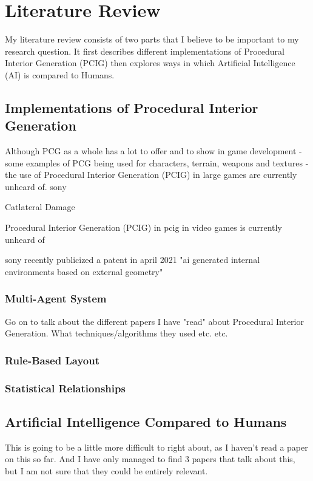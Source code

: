 \section{Literature Review}
My literature review consists of two parts that I believe to be important to my research question.
It first describes different implementations of Procedural Interior Generation (PCIG) then explores
ways in which Artificial Intelligence (AI) is compared to Humans.
\\
\subsection{Implementations of Procedural Interior Generation}
Although PCG as a whole has a lot to offer and to show in game development - some examples of PCG being used for
characters, terrain, weapons and textures - the use of Procedural Interior Generation (PCIG) in large games are currently unheard of.
sony \cite{sony-patent}

Catlateral Damage \cite{game:catlateral}


Procedural Interior Generation (PCIG) in 
pcig in video games is currently unheard of

sony recently publicized a patent in april 2021
"ai generated internal environments based on external geometry"

\subsubsection*{Multi-Agent System}
Go on to talk about the different papers I have "read" about Procedural Interior Generation.
What techniques/algorithms they used etc. etc. \cite{real-time-walkthroughs}
\subsubsection*{Rule-Based Layout}
\subsubsection*{Statistical Relationships}


\subsection{Artificial Intelligence Compared to Humans}
This is going to be a little more difficult to right about, as I haven't read a paper on this so far.
And I have only managed to find 3 papers that talk about this, but I am not sure that they could be entirely relevant.